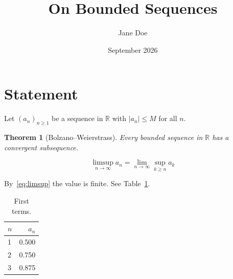 \documentclass[11pt,a4paper]{article}
\title{On Bounded Sequences}
\author{Jane Doe}
\date{September 2026}
\newtheorem{theorem}{Theorem}
\newcommand{\R}{\mathbb{R}}
\begin{document}
\maketitle

\section{Statement}
Let $(a_n)_{n \ge 1}$ be a sequence in $\R$ with $|a_n| \le M$ for all $n$.

\begin{theorem}[Bolzano--Weierstrass]
  Every bounded sequence in $\R$ has a convergent subsequence.
\end{theorem}

\begin{equation}\label{eq:limsup}
  \limsup_{n \to \infty} a_n = \lim_{n \to \infty} \sup_{k \ge n} a_k
\end{equation}

By~\eqref{eq:limsup} the value is finite. See Table~\ref{tab:values}.

\begin{table}[h]
  \centering
  \begin{tabular}{l r}
    \hline
    $n$ & $a_n$ \\ \hline
    1 & 0.500 \\
    2 & 0.750 \\
    3 & 0.875 \\ \hline
  \end{tabular}
  \caption{First terms.}\label{tab:values}
\end{table}
\end{document}
